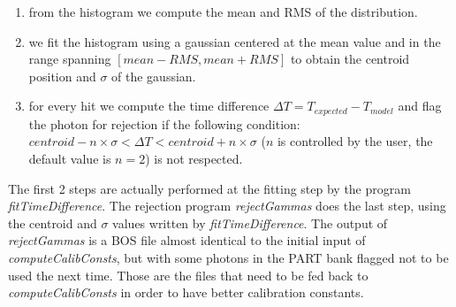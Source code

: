 \documentclass [12pt,letterpaper]{article}
\begin{document}
\begin{enumerate}
\item from the histogram we compute the mean and RMS of the distribution.
\item we fit the histogram using a gaussian centered at the mean value and in the range spanning $\left[mean - RMS, mean + RMS \right]$ to obtain the centroid position and $\sigma$ of the gaussian.
\item for every hit we compute the time difference $\Delta T = T_{expected} - T_{model}$ and flag the photon for rejection if the following condition: $centroid - n\times \sigma < \Delta T < centroid + n\times \sigma$ ($n$ is controlled by the user, the default value is $n = 2$) is not respected.
\end{enumerate}

The first 2 steps are actually performed at the fitting step by the program {\it fitTimeDifference}. The rejection program {\it rejectGammas} does the last step, using the centroid and $\sigma$ values written by {\it fitTimeDifference}. The output of {\it rejectGammas} is a BOS file almost identical to the initial input of {\it computeCalibConsts}, but with some photons in the PART bank flagged not to be used the next time. Those are the files that need to be fed back to {\it computeCalibConsts} in order to have better calibration constants. 
\end{document}
